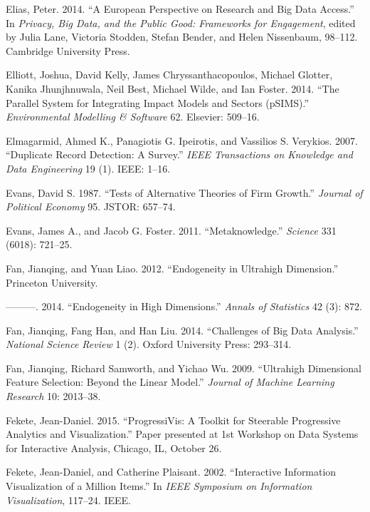 \documentclass[]{krantz}
\begin{document}
\hypertarget{ref-Elias2014}{}
Elias, Peter. 2014. ``A European Perspective on Research and Big Data
Access.'' In \emph{Privacy, Big Data, and the Public Good: Frameworks
for Engagement}, edited by Julia Lane, Victoria Stodden, Stefan Bender,
and Helen Nissenbaum, 98--112. Cambridge University Press.

\hypertarget{ref-elliott2014parallel}{}
Elliott, Joshua, David Kelly, James Chryssanthacopoulos, Michael
Glotter, Kanika Jhunjhnuwala, Neil Best, Michael Wilde, and Ian Foster.
2014. ``The Parallel System for Integrating Impact Models and Sectors
(pSIMS).'' \emph{Environmental Modelling \& Software} 62. Elsevier:
509--16.

\hypertarget{ref-elmagarmid2007duplicate}{}
Elmagarmid, Ahmed K., Panagiotis G. Ipeirotis, and Vassilios S.
Verykios. 2007. ``Duplicate Record Detection: A Survey.'' \emph{IEEE
Transactions on Knowledge and Data Engineering} 19 (1). IEEE: 1--16.

\hypertarget{ref-evans1987tests}{}
Evans, David S. 1987. ``Tests of Alternative Theories of Firm Growth.''
\emph{Journal of Political Economy} 95. JSTOR: 657--74.

\hypertarget{ref-Evans2011}{}
Evans, James A., and Jacob G. Foster. 2011. ``Metaknowledge.''
\emph{Science} 331 (6018): 721--25.

\hypertarget{ref-FanLiao2012}{}
Fan, Jianqing, and Yuan Liao. 2012. ``Endogeneity in Ultrahigh
Dimension.'' Princeton University.

\hypertarget{ref-fan2014endogeneity}{}
---------. 2014. ``Endogeneity in High Dimensions.'' \emph{Annals of
Statistics} 42 (3): 872.

\hypertarget{ref-fan2014challenges}{}
Fan, Jianqing, Fang Han, and Han Liu. 2014. ``Challenges of Big Data
Analysis.'' \emph{National Science Review} 1 (2). Oxford University
Press: 293--314.

\hypertarget{ref-fan2009ultrahigh}{}
Fan, Jianqing, Richard Samworth, and Yichao Wu. 2009. ``Ultrahigh
Dimensional Feature Selection: Beyond the Linear Model.'' \emph{Journal
of Machine Learning Research} 10: 2013--38.

\hypertarget{ref-fekete2015progressivis}{}
Fekete, Jean-Daniel. 2015. ``ProgressiVis: A Toolkit for Steerable
Progressive Analytics and Visualization.'' Paper presented at 1st
Workshop on Data Systems for Interactive Analysis, Chicago, IL, October
26.

\hypertarget{ref-fekete2002interactive}{}
Fekete, Jean-Daniel, and Catherine Plaisant. 2002. ``Interactive
Information Visualization of a Million Items.'' In \emph{IEEE Symposium
on Information Visualization}, 117--24. IEEE.
\end{document}

